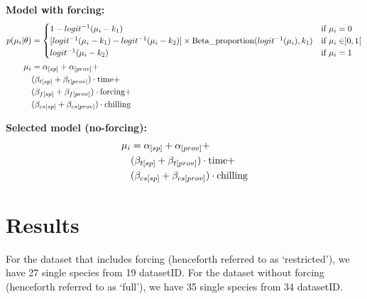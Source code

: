\documentclass{article}\usepackage[]{graphicx}\usepackage[]{xcolor}
\begin{document}
\textbf{Model with forcing:}
\begin{align}
p(\mu_i | \theta) &= \begin{cases} 
    1 -  logit^{-1}(\mu_i - k_1) & \text{if } \mu_i = 0 \\
    [logit^{-1}(\mu_i - k_1) - logit^{-1}(\mu_i - k_2)] \times \text{Beta\_proportion}(logit^{-1}(\mu_i), k_1) & \text{if } \mu_i \in ]0, 1[ \\
    logit^{-1}(\mu_i - k_2) & \text{if } \mu_i = 1
\end{cases} \\
\mu_i &= \alpha_{[sp]} + \alpha_{[prov]} + \\
& \notag (\beta_{t[sp]} + \beta_{t[prov]}) \cdot \text{time} + \\
& \notag (\beta_{f[sp]} + \beta_{f[prov]}) \cdot \text{forcing} + \\
& \notag (\beta_{cs[sp]} + \beta_{cs[prov]}) \cdot \text{chilling} \\
\end{align}

\textbf{Selected model (no-forcing):}
\begin{align}
\mu_i &= \alpha_{[sp]} + \alpha_{[prov]} + \\
& \notag (\beta_{t[sp]} + \beta_{t[prov]}) \cdot \text{time} + \\
& \notag (\beta_{cs[sp]} + \beta_{cs[prov]}) \cdot \text{chilling}
\end{align}

\section{Results}
For the dataset that includes forcing (henceforth referred to as `restricted'), we have 27 single species from 19 datasetID. For the dataset without forcing (henceforth referred to as `full'), we have 35 single species from 34 datasetID.
\end{document}
